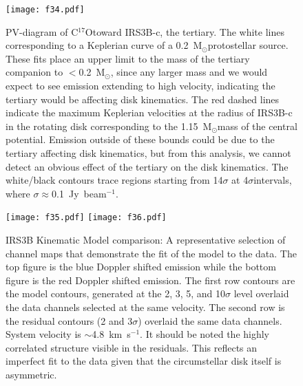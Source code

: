 \documentclass[twocolumn, 12pt]{aastex63}
\newcommand{\cso}{C$^{17}$O}
\newcommand{\ab}{$\sim$}
\newcommand{\solm}{M$_{\odot}$}
\begin{document}
\begin{figure}[H]
\begin{center}
\texttt{[image: f34.pdf]}
\end{center}
\caption{PV-diagram of \cso\space toward IRS3B-c, the tertiary. The white lines corresponding to a Keplerian curve of a 0.2~\solm\space protostellar source. These fits place an upper limit to the mass of the tertiary companion to $<$0.2~\solm, since any larger mass and we would expect to see emission extending to high velocity, indicating the tertiary would be affecting disk kinematics. The red dashed lines indicate the maximum Keplerian velocities at the radius of IRS3B-c in the rotating disk corresponding to the 1.15~\solm\space mass of the central potential. Emission outside of these bounds could be due to the tertiary affecting disk kinematics, but from this analysis, we cannot detect an obvious effect of the tertiary on the disk kinematics. The white/black contours trace regions starting from 14$\sigma$ at 4$\sigma$\space intervals, where $\sigma\approx$0.1~Jy~beam$^{-1}$.}\label{fig:l1448irs3b_c17o_pv_tert}
\end{figure}
\begin{figure}[H]
\begin{center}
\texttt{[image: f35.pdf]}
\texttt{[image: f36.pdf]}
\end{center}
\caption{IRS3B Kinematic Model comparison: A representative selection of channel maps that demonstrate the fit of the model to the data. The top figure is the blue Doppler shifted emission while the bottom figure is the red Doppler shifted emission. The first row contours are the model contours, generated at the 2, 3, 5, and 10$\sigma$ level overlaid the data channels selected at the same velocity. The second row is the residual contours (2 and 3$\sigma$) overlaid the same data channels. System velocity is \ab4.8~km~s$^{-1}$. It should be noted the highly correlated structure visible in the residuals. This reflects an imperfect fit to the data given that the circumstellar disk itself is asymmetric.}\label{fig:c17o_res}
\end{figure}
\end{document}
